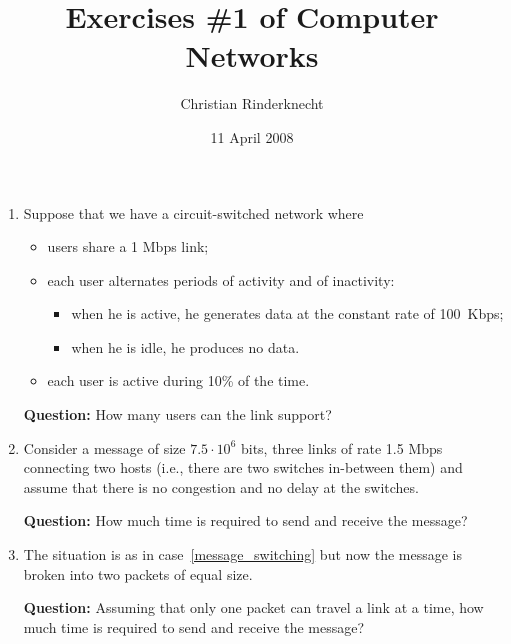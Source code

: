 \documentclass[11pt,a4paper]{article}
\title{Exercises \#1 of Computer Networks}
\author{Christian Rinderknecht}
\date{11 April 2008}
\begin{document}
\maketitle

\thispagestyle{empty}

\begin{enumerate}

  \item Suppose that we have a circuit-switched network where
    \begin{itemize}

      \item users share a 1 Mbps link;

      \item each user alternates periods of activity and of inactivity:
        \begin{itemize}

          \item when he is active, he generates data at the constant
            rate of 100~Kbps;

          \item when he is idle, he produces no data.

        \end{itemize}

      \item each user is active during 10\% of the time.

    \end{itemize}
    \textbf{Question:} How many users can the link support?

  \item \label{message_switching} Consider a message of size \(7.5
    \cdot 10^6\) bits, three links of rate 1.5 Mbps connecting two
    hosts (i.e., there are two switches in-between them) and assume
    that there is no congestion and no delay at the switches.

    \textbf{Question:} How much time is required to send and receive
    the message?

  \item The situation is as in case~\ref{message_switching} but now
    the message is broken into two packets of equal size.

    \textbf{Question:} Assuming that only one packet can travel a link
    at a time, how much time is required to send and receive the
    message?


\end{enumerate}
\end{document}
